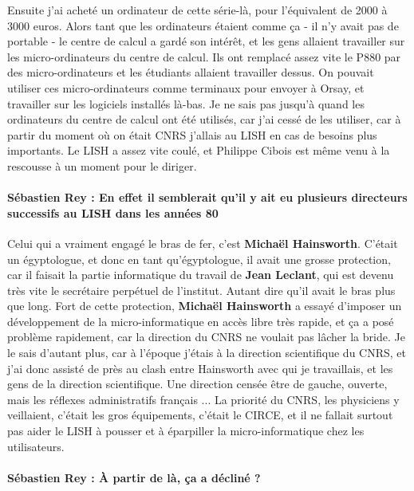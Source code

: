 Ensuite j'ai acheté un ordinateur de cette série-là, pour l'équivalent de 2000 à 3000 euros. Alors tant que les ordinateurs étaient comme ça - il n'y avait pas de portable - le centre de calcul a gardé son intérêt, et les gens allaient travailler sur les micro-ordinateurs du centre de calcul. Ils ont remplacé assez vite le P880  par des micro-ordinateurs et les étudiants allaient travailler dessus. On pouvait utiliser ces micro-ordinateurs comme terminaux pour envoyer à Orsay, et travailler sur les logiciels installés là-bas. 
 Je ne sais pas jusqu'à quand les ordinateurs du centre de calcul ont été utilisés, car j'ai cessé de les utiliser, car à partir du moment où on était CNRS j'allais au LISH en cas de besoins plus importants. Le LISH a assez vite coulé, et Philippe Cibois est même venu à la rescousse à un moment pour le diriger.

\paragraph*{Sébastien Rey : En effet il semblerait qu'il y ait eu plusieurs directeurs successifs au LISH dans les années 80}

Celui qui a vraiment engagé le bras de fer, c'est \textbf{Michaël Hainsworth}. C'était un égyptologue, et donc en tant qu'égyptologue, il avait une grosse protection, car il faisait la partie informatique du travail de \textbf{Jean Leclant}, qui est devenu très vite le secrétaire perpétuel de l'institut. Autant dire qu'il avait le bras plus que long. Fort de cette protection, \textbf{Michaël Hainsworth} a essayé d'imposer un développement de la micro-informatique en accès libre très rapide, et ça a posé problème rapidement, car la direction du CNRS ne voulait pas lâcher la bride. Je le sais d'autant plus, car à l'époque j'étais à la direction scientifique du CNRS, et j'ai donc assisté de près au clash entre Hainsworth avec qui je travaillais, et les gens de la direction scientifique. Une direction censée être de gauche, ouverte, mais les réflexes administratifs français ... La priorité du CNRS, les physiciens y veillaient, c'était les gros équipements, c'était le CIRCE, et il ne fallait surtout pas aider le LISH à pousser et à éparpiller la micro-informatique chez les utilisateurs.  

\paragraph*{Sébastien Rey : À partir de là, ça a décliné ?}

